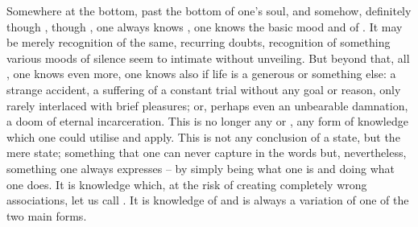 \inv %
%
Somewhere at the bottom, past the bottom of one's soul, and somehow, definitely
though ,  though , one always knows
, one knows the basic mood and  of .  It
may be merely recognition of the same, recurring doubts, recognition of
something various moods of silence seem to intimate without unveiling.  But
beyond that,  all , one knows even more, one knows
also if life is a generous  or something else: a strange accident, a
suffering of a constant trial without any goal or reason, only rarely interlaced
with brief pleasures; or, perhaps even an unbearable damnation, a doom of
eternal incarceration. This is no longer any  or , any
form of knowledge which one could utilise and apply. This is not any 
conclusion of a state, but the mere state; something that one can never
capture in the  words but, nevertheless, something one always
expresses -- by simply being what one is and doing what one does. It is
 knowledge which, at the risk of creating completely wrong
associations, let us call . It is knowledge of  and is
always a variation of one of the two main forms.

